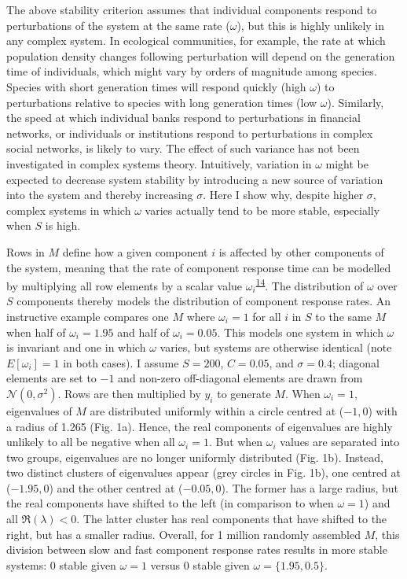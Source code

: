 \documentclass[]{article}
\begin{document}
The above stability criterion assumes that individual components respond
to perturbations of the system at the same rate (\(\omega\)), but this
is highly unlikely in any complex system. In ecological communities, for
example, the rate at which population density changes following
perturbation will depend on the generation time of individuals, which
might vary by orders of magnitude among species. Species with short
generation times will respond quickly (high \(\omega\)) to perturbations
relative to species with long generation times (low \(\omega\)).
Similarly, the speed at which individual banks respond to perturbations
in financial networks, or individuals or institutions respond to
perturbations in complex social networks, is likely to vary. The effect
of such variance has not been investigated in complex systems theory.
Intuitively, variation in \(\omega\) might be expected to decrease
system stability by introducing a new source of variation into the
system and thereby increasing \(\sigma\). Here I show why, despite
higher \(\sigma\), complex systems in which \(\omega\) varies actually
tend to be more stable, especially when \(S\) is high.

Rows in \(M\) define how a given component \(i\) is affected by other
components of the system, meaning that the rate of component response
time can be modelled by multiplying all row elements by a scalar value
\(\omega_{i}\)\textsuperscript{\protect\hyperlink{ref-Patel2018}{14}}.
The distribution of \(\omega\) over \(S\) components thereby models the
distribution of component response rates. An instructive example
compares one \(M\) where \(\omega_{i} = 1\) for all \(i\) in \(S\) to
the same \(M\) when half of \(\omega_{i} = 1.95\) and half of
\(\omega_{i} = 0.05\). This models one system in which \(\omega\) is
invariant and one in which \(\omega\) varies, but systems are otherwise
identical (note \(E[\omega_{i}] = 1\) in both cases). I assume
\(S = 200\), \(C = 0.05\), and \(\sigma = 0.4\); diagonal elements are
set to \(-1\) and non-zero off-diagonal elements are drawn from
\(\mathcal{N}(0, \sigma^{2})\). Rows are then multiplied by \(y_{i}\) to
generate \(M\). When \(\omega_{i} = 1\), eigenvalues of \(M\) are
distributed uniformly within a circle centred at (\(-1, 0\)) with a
radius of 1.265 (Fig. 1a). Hence, the real components of eigenvalues are
highly unlikely to all be negative when all \(\omega_{i} = 1\). But when
\(\omega_{i}\) values are separated into two groups, eigenvalues are no
longer uniformly distributed (Fig. 1b). Instead, two distinct clusters
of eigenvalues appear (grey circles in Fig. 1b), one centred at
(\(-1.95, 0\)) and the other centred at (\(-0.05, 0\)). The former has a
large radius, but the real components have shifted to the left (in
comparison to when \(\omega = 1\)) and all \(\Re({\lambda}) < 0\). The
latter cluster has real components that have shifted to the right, but
has a smaller radius. Overall, for 1 million randomly assembled \(M\),
this division between slow and fast component response rates results in
more stable systems: 0 stable given \(\omega = 1\) versus 0 stable given
\(\omega = \{1.95, 0.5\}\).
\end{document}
